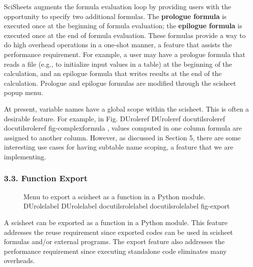 \documentclass[letterpaper,compsoc,twoside]{IEEEtran}
\providecommand*{\DUrole}[2]{%
  \ifcsname DUrole#1\endcsname%
    \csname DUrole#1\endcsname{#2}%
  \else%
    \ifcsname docutilsrole#1\endcsname%
      \csname docutilsrole#1\endcsname{#2}%
    \else%
      #2%
    \fi%
  \fi%
}
\begin{document}
SciSheets augments the formula evaluation loop by providing users with the opportunity
to specify two additional formulas.
The \textbf{prologue formula} is executed once at the beginning of formula evaluation;
the \textbf{epilogue formula} is executed once at the end of formula evaluation.
These formulas provide a way to do high overhead operations in a one-shot manner,
a feature
that assists the performance requirement.
For example, a user may have a prologue formula that
reads a file (e.g., to initialize input values in a table) at the beginning
of the calculation, and an epilogue formula
that writes results at the end of the calculation.
Prologue and epilogue formulas are modified through the scisheet popup menu.

At present, variable names have a global scope within the scisheet.
This is often a desirable feature.
For example, in
Fig. \DUrole{ref}{fig-complexformula}, values computed in one column formula
are assigned to another column.
However, as discussed in Section 5, there are some interesting use cases
for having subtable name scoping,
a feature that we are implementing.

\subsubsection{3.3. Function Export%
  \label{function-export}%
}
\begin{figure}[]\noindent{}
\caption{Menu to export a scisheet as a
function in a Python module.
\DUrole{label}{fig-export}}
\end{figure}

A scisheet can be exported as
a function in a Python module.
This feature addresses the reuse requirement since
exported codes can be used in scisheet formulas
and/or external programs.
The export feature also addresses the performance requirement
since executing standalone code eliminates
many overheads.
\end{document}
